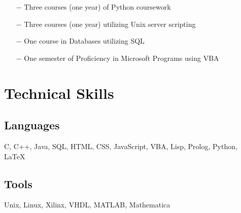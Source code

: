 \documentclass{article}
\begin{document}
\begin{itemize}
	\item[$-$] Three courses (one year) of Python coursework
	\item[$-$] Three courses (one year) utilizing Unix server scripting
	\item[$-$] One course in Databases utilizing SQL
	\item[$-$] One semester of Proficiency in Microsoft Programs using VBA
\end{itemize}

\section{Technical Skills}

\subsection{Languages}

C, C++, Java, SQL, HTML, CSS, JavaScript, VBA, Lisp, Prolog, Python, \LaTeX

\subsection{Tools}

Unix, Linux, Xilinx, VHDL, MATLAB, Mathematica
\end{document}
